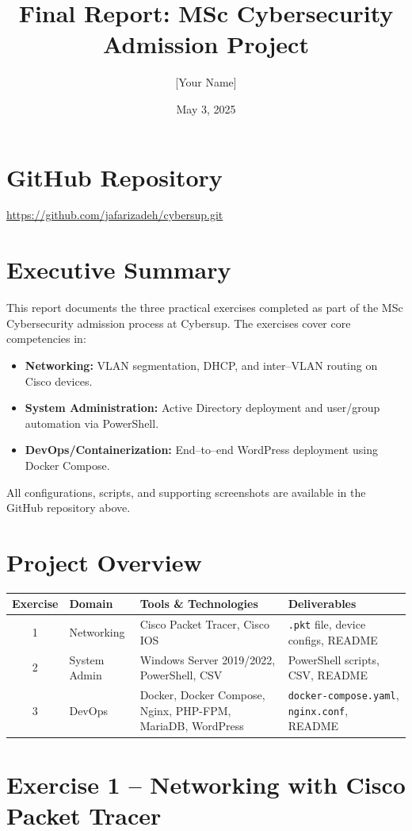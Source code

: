 \documentclass[11pt,a4paper]{article}
\title{Final Report: MSc Cybersecurity Admission Project}
\author{[Your Name]}
\date{May 3, 2025}
\begin{document}
\maketitle

\section*{GitHub Repository}
\noindent
\url{https://github.com/jafarizadeh/cybersup.git}

\section*{Executive Summary}
This report documents the three practical exercises completed as part of the MSc Cybersecurity admission process at Cybersup. The exercises cover core competencies in:
\begin{itemize}
  \item \textbf{Networking:} VLAN segmentation, DHCP, and inter–VLAN routing on Cisco devices.
  \item \textbf{System Administration:} Active Directory deployment and user/group automation via PowerShell.
  \item \textbf{DevOps/Containerization:} End–to–end WordPress deployment using Docker Compose.
\end{itemize}
All configurations, scripts, and supporting screenshots are available in the GitHub repository above.

\section*{Project Overview}
\begin{longtable}{|c|p{3cm}|p{5cm}|p{4cm}|}
    \hline
    \textbf{Exercise} & \textbf{Domain} & \textbf{Tools \& Technologies} & \textbf{Deliverables} \\ \hline
    1 & Networking & Cisco Packet Tracer, Cisco IOS & \texttt{.pkt} file, device configs, README \\ \hline
    2 & System Admin & Windows Server 2019/2022, PowerShell, CSV & PowerShell scripts, CSV, README \\ \hline
    3 & DevOps & Docker, Docker Compose, Nginx, PHP-FPM, MariaDB, WordPress & \texttt{docker-compose.yaml}, \texttt{nginx.conf}, README \\ \hline
\end{longtable}

\section{Exercise 1 – Networking with Cisco Packet Tracer}
\end{document}
